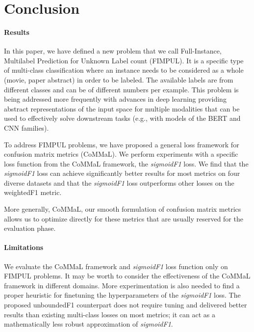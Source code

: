 
\section{Conclusion}
\label{sec:orged3d8a1}


\paragraph{Results}
In this paper, we have defined a new problem that we call Full-Instance, Multilabel Prediction for Unknown Label count (FIMPUL). It is a specific type of multi-class classification where an instance needs to be considered as a whole (movie, paper abstract) in order to be labeled. The available labels are from different classes and can be of different numbers per example. This problem is being addressed more frequently with advances in deep learning providing abstract representations of the input space for multiple modalities that can be used to effectively solve downstream tasks (e.g., with models of the BERT and CNN families).

To address FIMPUL problems, we have proposed a general loss framework for confusion matrix metrics (CoMMaL). We perform experiments with a specific loss function from the CoMMaL framework, the \emph{sigmoidF1} loss. We find that the \emph{sigmoidF1} loss can achieve significantly better results for most metrics on four diverse datasets and that the \emph{sigmoidF1} loss outperforms other losses on the weightedF1 metric.

More generally, CoMMaL, our smooth formulation of confusion matrix metrics allows us to optimize directly for these metrics that are usually reserved for the evaluation phase.

\paragraph{Limitations}
We evaluate the CoMMaL framework and \emph{sigmoidF1} loss function only on FIMPUL problems. It may be worth to consider the effectiveness of the CoMMaL framework in different domains. More experimentation is also needed to find a proper heuristic for finetuning the hyperparameters of the \emph{sigmoidF1} loss. The proposed unboundedF1 counterpart does not require tuning and delivered better results than existing multi-class losses on most metrics; it can act as a mathematically less robust approximation of \emph{sigmoidF1}.

